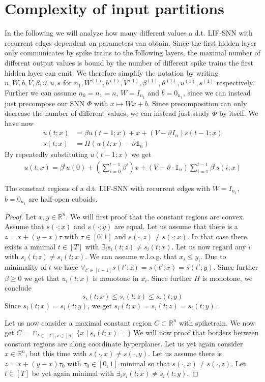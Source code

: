 \section{Complexity of input partitions}
\label{ch:partitions}

In the following we will analyze how many different values a d.t. LIF-SNN with recurrent edges dependent on parameters can obtain.
Since the first hidden layer only communicates by spike trains to the following layers, the maximal number of different output values is bound by the number of different spike trains the first hidden layer can emit.
We therefore simplify the notation by writing \(n,W,b,V,β,ϑ,u,s\) for \(n_1,W^{(1)},b^{(1)},V^{(1)},β^{(1)},ϑ^{(1)},u^{(1)},s^{(1)}\) respectively.
Further we can assume \(n_0=n_1=n\), \(W=I_{n_1}\) and \(b=0_{n_1}\), since we can instead just precompose our SNN \(Φ\) with \(x↦Wx+b\). Since precomposition can only decrease the number of different values, we can instead just study \(Φ\) by itself.
We have now
\begin{align*}
 u(t;x)&=βu(t-1;x)+x+(V-ϑI_n)s(t-1;x) \\
 s(t;x)&=H(u(t;x)-ϑ𝟙_n)
\end{align*}
By repeatedly substituting \(u(t-1;x)\) we get
\begin{align*}
 u(t;x)=β^tu(0)+(\sum_{i=0}^{t-1}β^i)x+(V-ϑ·𝟙_n)\sum_{i=1}^{t-1}β^is(i;x)
\end{align*}

\begin{lemma}
The constant regions of a d.t. LIF-SNN with recurrent edges with \(W=I_{n_1}\), \(b=0_{n_1}\) are half-open cuboids.
\end{lemma}

\begin{proof}
  Let \(x,y∈ℝ^n\). We will first proof that the constant regions are convex. Assume that \(s(·;x)\) and \(s(·;y)\) are equal. Let us assume that there is a \(z=x+(y-x)τ\) with \(τ∈[0,1]\) and \(s(·,z)≠s(·;x)\). In that case there exists a minimal \(t∈[T]\) with \(∃_is_i(t;z)≠s_i(t;x)\).
  Let us now regard any \(i\) with \(s_i(t;z)≠s_i(t;x)\). We can assume w.l.o.g. that \(x_i≤y_i\). Due to minimality of \(t\) we have \(∀_{t'∈[t-1]}s(t';z)=s(t';x)=s(t';y)\). Since further \(β≥0\) we get that \(u_i(t;x)\) is monotone in \(x_i\). Since further \(H\) is monotone, we conclude
  \[ s_i(t;x)≤s_i(t;z)≤s_i(t;y) \]
  Since \(s_i(t;x)=s_i(t;y)\), we get \(s_i(t;x)=s_i(t;z)=s_i(t;y)\).

  Let us now consider a maximal constant region \(C⊂ℝ^n\) with spiketrain.
  We now get \(C=\cap_{t∈[T],i∈[n]}\{x\mid s_i(t;x)=\}\)
  We will now proof that borders between constant regions are along coordinate hyperplanes.
  Let us yet again consider \(x∈ℝ^n\), but this time with \(s(·,x)≠s(·,y)\). Let us assume there is \(z=x+(y-x)τ_0\) with \(τ_0∈[0,1]\) minimal so that \(s(·,x)≠s(·,z)\).
  Let \(t∈[T]\) be yet again minimal with \(∃_is_i(t;x)≠s_i(t;y)\).
\end{proof}

